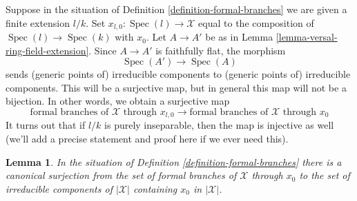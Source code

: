 \documentclass{stacks-project}
\theoremstyle{plain}
\newtheorem{lemma}[subsection]{Lemma}
\theoremstyle{definition}
\theoremstyle{remark}
\numberwithin{equation}{subsection}
\def\Spec{\mathop{\mathrm{Spec}}}
\begin{document}
\noindent
Suppose in the situation of Definition \ref{definition-formal-branches}
we are given a finite extension $l/k$. Set
$x_{l, 0} : \Spec(l) \to \mathcal{X}$ equal to the composition of
$\Spec(l) \to \Spec(k)$ with $x_0$. Let
$A \to A'$ be as in Lemma \ref{lemma-versal-ring-field-extension}.
Since $A \to A'$ is faithfully flat, the morphism
$$
\Spec(A') \to \Spec(A)
$$
sends (generic points of) irreducible components to
(generic points of) irreducible components.
This will be a surjective map, but
in general this map will not be a bijection.
In other words, we obtain a surjective map
$$
\text{formal branches of }\mathcal{X}\text{ through }x_{l, 0}
\longrightarrow
\text{formal branches of }\mathcal{X}\text{ through }x_0
$$
It turns out that if $l/k$ is purely inseparable, then
the map is injective as well (we'll add a precise statement
and proof here if we ever need this).

\begin{lemma}
\label{lemma-branches}
In the situation of Definition \ref{definition-formal-branches}
there is a canonical surjection from the set of formal branches of
$\mathcal{X}$ through $x_0$ to the set of irreducible components of
$|\mathcal{X}|$ containing $x_0$ in $|\mathcal{X}|$.
\end{lemma}
\end{document}
